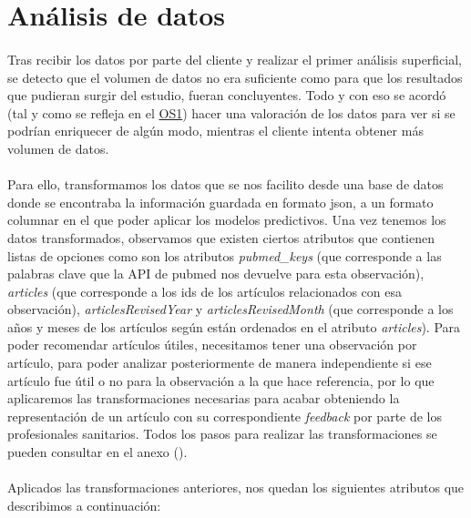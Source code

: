 \section{Análisis de datos}
\label{section:analisis_datos}

\paragraph{}
Tras recibir los datos por parte del cliente y realizar el primer análisis superficial, se detecto que el volumen de datos no era suficiente como para que los resultados que pudieran surgir del estudio, fueran concluyentes. Todo y con eso se acordó (tal y como se refleja en el \hyperref[os:OS1]{OS1}) hacer una valoración de los datos para ver si se podrían enriquecer de algún modo, mientras el cliente intenta obtener más volumen de datos.

\paragraph{}
Para ello, transformamos los datos que se nos facilito desde una base de datos donde se encontraba la información guardada en formato json, a un formato columnar en el que poder aplicar los modelos predictivos. Una vez tenemos los datos transformados, observamos que existen ciertos atributos que contienen listas de opciones como son los atributos \textit{pubmed\_keys} (que corresponde a las palabras clave que la API\cite{ref:pubmed_api} de pubmed nos devuelve para esta observación), \textit{articles} (que corresponde a los ids de los artículos relacionados con esa observación), \textit{articlesRevisedYear} y \textit{articlesRevisedMonth} (que corresponde a los años y meses de los artículos según están ordenados en el atributo \textit{articles}). Para poder recomendar artículos útiles, necesitamos tener una observación por artículo, para poder analizar posteriormente de manera independiente si ese artículo fue útil o no para la observación a la que hace referencia, por lo que aplicaremos las transformaciones necesarias para acabar obteniendo la representación de un artículo con su correspondiente \textit{feedback} por parte de los profesionales sanitarios. Todos los pasos para realizar las transformaciones se pueden consultar en el anexo ().

\paragraph{}
Aplicados las transformaciones anteriores, nos quedan los siguientes atributos que describimos a continuación:

